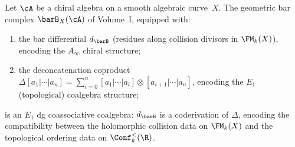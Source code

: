\begin{theorem}
\label{thm:bar-swiss-cheese}
Let $\cA$ be a chiral algebra on a smooth algebraic curve~$X$.
The geometric bar complex $\barB_X(\cA)$ of Volume~I, equipped
with:
\begin{enumerate}[label=\textup{(\roman*)}]
\item the bar differential $d_{\barB}$ (residues along collision
 divisors in $\FM_k(X)$), encoding the $A_\infty$ chiral
 structure;
\item the deconcatenation coproduct
 $\Delta[a_1|\cdots|a_n]
 = \sum_{i=0}^{n}
 [a_1|\cdots|a_i]
 \otimes [a_{i+1}|\cdots|a_n]$,
 encoding the $E_1$ (topological) coalgebra structure;
\end{enumerate}
is an $E_1$ dg coassociative coalgebra: $d_{\barB}$ is a
coderivation of $\Delta$, encoding the compatibility between
the holomorphic collision data on $\FM_k(X)$ and the topological
ordering data on $\Conf_k^{<}(\R)$.
\end{theorem}

